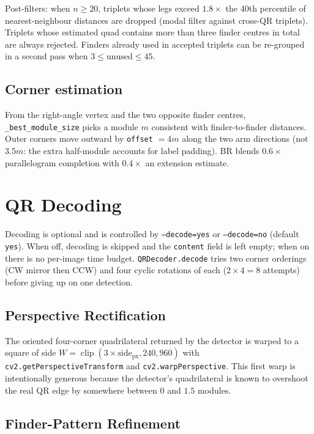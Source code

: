 \documentclass[11pt,a4paper]{article}
\begin{document}
Post-filters: when $n \ge 20$, triplets whose legs exceed
$1.8\times$ the 40th percentile of nearest-neighbour distances are dropped
(modal filter against cross-QR triplets). Triplets whose estimated quad
contains more than three finder centres in total are always rejected. Finders
already used in accepted triplets can be re-grouped in a second pass when
$3 \le \text{unused} \le 45$.

\subsection{Corner estimation}

From the right-angle vertex and the two opposite finder centres,
\texttt{\_best\_module\_size} picks a module $m$ consistent with
finder-to-finder distances. Outer corners move outward by
\texttt{offset} $= 4m$ along the two arm directions (not $3.5m$: the
extra half-module accounts for label padding). BR blends $0.6\times$
parallelogram completion with $0.4\times$ an extension estimate.

\section{QR Decoding}

Decoding is optional and is controlled by \texttt{---decode=yes} or
\texttt{---decode=no} (default \texttt{yes}). When off, decoding is skipped
and the \texttt{content} field is left empty; when on there is no per-image
time budget. \texttt{QRDecoder.decode} tries two corner orderings (CW mirror
then CCW) and four cyclic rotations of each ($2\times4=8$ attempts) before
giving up on one detection.

\subsection{Perspective Rectification}

The oriented four-corner quadrilateral returned by the detector is
warped to a square of side
$W = \operatorname{clip}(3 \times \text{side}_{\text{px}}, 240, 960)$
with \texttt{cv2.getPerspectiveTransform} and
\texttt{cv2.warpPerspective}. This first warp is intentionally generous
because the detector's quadrilateral is known to overshoot the real QR
edge by somewhere between $0$ and $1.5$ modules.

\subsection{Finder-Pattern Refinement}
\end{document}
